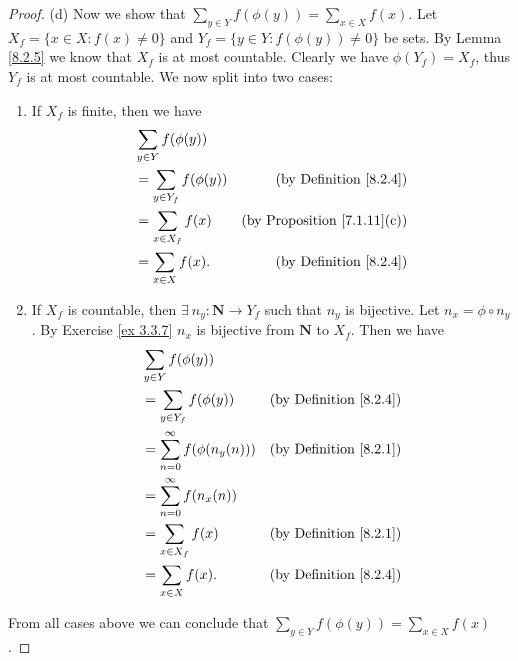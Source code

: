 \begin{proof}{(d)}
    Now we show that \(\sum_{y \in Y} f(\phi(y)) = \sum_{x \in X} f(x)\).
    Let \(X_f = \{x \in X : f(x) \neq 0\}\) and \(Y_f = \{y \in Y : f(\phi(y)) \neq 0\}\) be sets.
    By Lemma \ref{8.2.5} we know that \(X_f\) is at most countable.
    Clearly we have \(\phi(Y_f) = X_f\), thus \(Y_f\) is at most countable.
    We now split into two cases:
    \begin{enumerate}[label=(\Roman*)]
        \item If \(X_f\) is finite, then we have
              \begin{align*}
                   & \sum_{y \in Y} f(\phi(y))                                               \\
                   & = \sum_{y \in Y_f} f(\phi(y)) & \text{(by Definition \ref{8.2.4})}      \\
                   & = \sum_{x \in X_f} f(x)       & \text{(by Proposition \ref{7.1.11}(c))} \\
                   & = \sum_{x \in X} f(x).        & \text{(by Definition \ref{8.2.4})}
              \end{align*}
        \item If \(X_f\) is countable, then \(\exists\ n_y : \mathbf{N} \to Y_f\) such that \(n_y\) is bijective.
              Let \(n_x = \phi \circ n_y\).
              By Exercise \ref{ex 3.3.7} \(n_x\) is bijective from \(\mathbf{N}\) to \(X_f\).
              Then we have
              \begin{align*}
                   & \sum_{y \in Y} f(\phi(y))                                                  \\
                   & = \sum_{y \in Y_f} f(\phi(y))         & \text{(by Definition \ref{8.2.4})} \\
                   & = \sum_{n = 0}^\infty f(\phi(n_y(n))) & \text{(by Definition \ref{8.2.1})} \\
                   & = \sum_{n = 0}^\infty f(n_x(n))                                            \\
                   & = \sum_{x \in X_f} f(x)               & \text{(by Definition \ref{8.2.1})} \\
                   & = \sum_{x \in X} f(x).                & \text{(by Definition \ref{8.2.4})}
              \end{align*}
    \end{enumerate}
    From all cases above we can conclude that \(\sum_{y \in Y} f(\phi(y)) = \sum_{x \in X} f(x)\).
\end{proof}


